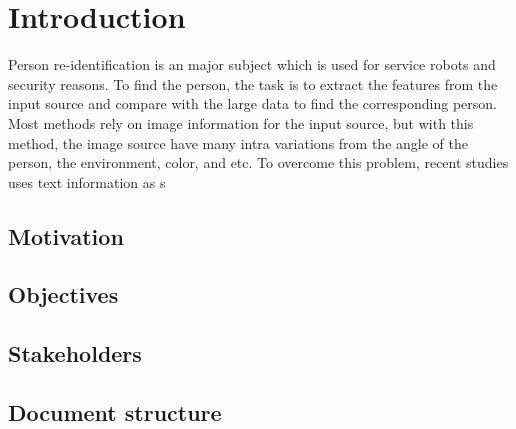 \chapter{Introduction}
Person re-identification is an major subject which is used for service robots and security reasons. 
To find the person, the task is to extract the features from the input source and compare with the large data to find the corresponding person. Most methods rely on image information for the input source,%
 but with this method, the image source have many intra variations from the angle of the person, the environment, color, and etc.
To overcome this problem, recent studies uses text information as s
\section{Motivation}

\section{Objectives}

\section{Stakeholders}

\section{Document structure}